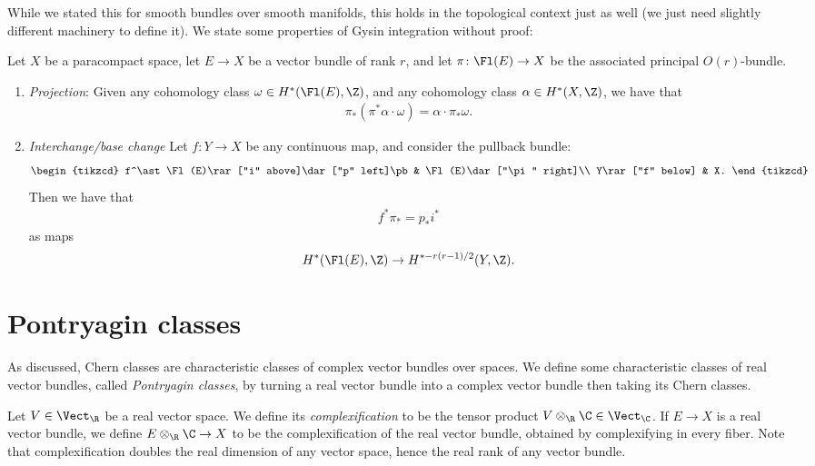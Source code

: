 \documentclass[11pt]{book}
\begin{document}
While we stated this for smooth bundles over smooth manifolds, this holds in the topological context just as well (we just need slightly different machinery to define it). We state some properties of Gysin integration without proof:

\begin{proposition}
\label{prop:properties-Gysin-integration}
Let $X$ be a paracompact space, let $E \to X$ be a vector bundle of rank $r$, and let $\pi \colon \Fl(E) \to X$ be the associated principal $O(r)$-bundle.
\begin{enumerate}
    \item \emph{Projection}: Given any cohomology class $\omega \in H^\ast(\Fl(E),\Z)$, and any cohomology class $\alpha\in H^\ast(X,\Z)$, we have that
    \begin{align*}
        \pi_\ast (\pi^\ast \alpha \cdot \omega) = \alpha \cdot \pi_\ast \omega.
    \end{align*}
    \item \emph{Interchange/base change} Let $f \colon Y \to X$ be any continuous map, and consider the pullback bundle:
\[ \begin{tikzcd}
    f^\ast \Fl(E)\rar["i" above]\dar["p" left]\pb & \Fl(E)\dar["\pi" right]\\
    Y\rar["f" below] & X.
\end{tikzcd} \]
Then we have that
\begin{align*}
    f^\ast\pi_\ast = p_\ast i^\ast
\end{align*}
as maps
\begin{align*}
    H^\ast(\Fl(E),\Z) \to H^{\ast - r(r-1)/2}(Y,\Z).
\end{align*}
\end{enumerate}
\end{proposition}




\section{Pontryagin classes}

As discussed, Chern classes are characteristic classes of complex vector bundles over spaces. We define some characteristic classes of real vector bundles, called \emph{Pontryagin classes}, by turning a real vector bundle into a complex vector bundle then taking its Chern classes.

\begin{definition}\label{def:complexification} Let $V\in \Vect_\R$ be a real vector space. We define its \emph{complexification} to be the tensor product $V \otimes_\R \C \in \Vect_\C$. If $E \to X$ is a real vector bundle, we define $E \otimes_\R \C \to X$ to be the complexification of the real vector bundle, obtained by complexifying in every fiber. Note that complexification doubles the real dimension of any vector space, hence the real rank of any vector bundle.
\end{definition}
\end{document}
